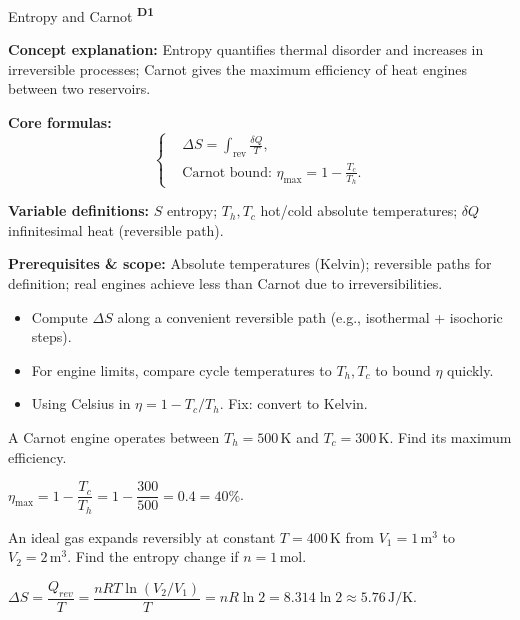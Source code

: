 ﻿\documentclass[12pt,a4paper]{article}
\providecommand{\KPFormulas}{}
\providecommand{\KPHeuristics}{}
\providecommand{\KPProblems}{}
\newcommand{\DOne}{\texorpdfstring{\textsuperscript{\textbf{D1}}}{ D1}}
\begin{document}
\begin{KnowledgePoint}{Entropy and Carnot \DOne}
  \KPFormulas
  \begin{formulabox}
  \textbf{Concept explanation:} Entropy quantifies thermal disorder and increases in irreversible processes; Carnot gives the maximum efficiency of heat engines between two reservoirs.

  \textbf{Core formulas:}
  \[
  \left\{\begin{aligned}
    &\Delta S=\int_{\text{rev}} \frac{\delta Q}{T},\\
    &\text{Carnot bound: } \eta_{\max}=1-\frac{T_c}{T_h}.
  \end{aligned}\right.
  \]

  \textbf{Variable definitions:} $S$ entropy; $T_h,T_c$ hot/cold absolute temperatures; $\delta Q$ infinitesimal heat (reversible path).

  

  \textbf{Prerequisites \& scope:} Absolute temperatures (Kelvin); reversible paths for definition; real engines achieve less than Carnot due to irreversibilities.
  \end{formulabox}

  \KPHeuristics
  \begin{heuristicsbox}
  \begin{itemize}[leftmargin=*]
    \item Compute $\Delta S$ along a convenient reversible path (e.g., isothermal + isochoric steps).
    \item For engine limits, compare cycle temperatures to $T_h,T_c$ to bound $\eta$ quickly.
  \end{itemize}
  \vspace{0.4em}
  \begin{itemize}[leftmargin=*]
    \item Using Celsius in $\eta=1-T_c/T_h$. Fix: convert to Kelvin.
  \end{itemize}
  \end{heuristicsbox}

  \KPProblems
\begin{cheatproblem}
  A Carnot engine operates between $T_h=500\,\text{K}$ and $T_c=300\,\text{K}$. Find its maximum efficiency.
\begin{solutionbox}
  $\eta_{\max}=1-\dfrac{T_c}{T_h}=1-\dfrac{300}{500}=0.4=40\%$.
\end{solutionbox}
\end{cheatproblem}
\begin{cheatproblem}
  An ideal gas expands reversibly at constant $T=400\,\text{K}$ from $V_1=1\,\text{m}^3$ to $V_2=2\,\text{m}^3$. Find the entropy change if $n=1\,\text{mol}$.
\begin{solutionbox}
  $\Delta S=\dfrac{Q_{rev}}{T}=\dfrac{nRT\ln(V_2/V_1)}{T}=nR\ln2=8.314\ln2\approx5.76\,\text{J/K}$.
\end{solutionbox}
\end{cheatproblem}
\end{KnowledgePoint}
\end{document}

